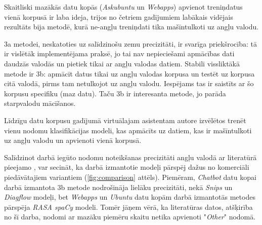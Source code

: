 Skaitliski mazākās datu kopās (\textit{Askubuntu} un \textit{Webapps}) apvienot treniņdatus vienā korpusā ir laba ideja, trijos no četriem gadījumiem labākais vidējais rezultāts bija metodē, kurā ne-angļu treniņdati tika mašīntulkoti uz angļu valodu.  

3a metodei, neskatoties uz salīdzinošu zemu precizitāti, ir svarīga priekšrocība: tā ir vislētāk implementējama praksē, jo tai nav nepieciešami apmācības dati daudzās valodās un pietiek tikai ar angļu valodas datiem. Stabili vissliktākā metode ir 3b: apmācīt datus tikai uz angļu valodas korpusa un testēt uz korpusa citā valodā, pirms tam netulkojot uz angļu valodu. Iespējams tas ir saistīts ar šo korpusu specifiku (maz datu). Taču 3b ir interesanta metode, jo parāda starpvalodu mācīšanos.

Līdzīgu datu korpusu gadījumā virtuālajam asistentam autore izvēlētos trenēt vienu nodomu klasifikācijas modeli, kas apmācīts uz datiem, kas ir mašīntulkoti uz angļu valodu un apvienoti vienā korpusā.


Salīdzinot darbā iegūto nodomu noteikšanas precizitāti angļu valodā ar literatūrā pieejamo \cite{fasttext2019}, var secināt, ka darbā izmantotie modeļi pārspēj dažus no komerciāli piedāvātajiem variantiem (\ref{fig:comparison} attēls). Piemēram, \textit{Chatbot} datu kopai darbā izmantota 3b metode nodrošināja lielāku precizitāti, nekā \textit{Snips} un \textit{Diagflow} modeļi, bet \textit{Webapps} un \textit{Ubuntu} datu kopām darbā izmantotās metodes pārspēja \textit{RASA spaCy} modeli. Tomēr jāņem vērā, ka literatūras datos, atšķirība no šī darba, nodomi ar mazāku piemēru skaitu netika apvienoti "\textit{Other}" nodomā.







